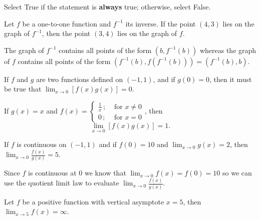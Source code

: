 \documentclass{ximera}
\author{Nela Lakos \and Kyle Parsons \and Bobby Ramsey}
\begin{document}
\begin{exercise}
	Select True if the statement is \textbf{always} true; otherwise, select False.

	Let $f$ be a one-to-one function and $f^{-1}$ its inverse.  If the point $(4,3)$ lies on the graph of $f^{-1}$, then the point $(3,4)$ lies on the graph of $f$.
	\begin{multipleChoice}
	\end{multipleChoice}
	\begin{feedback}
		The graph of $f^{-1}$ contains all points of the form $\left(b,f^{-1}(b)\right)$ whereas the graph of $f$ contains all points of the form $\left(f^{-1}(b),f(f^{-1}(b))\right)=\left(f^{-1}(b),b\right)$.
	\end{feedback}

	\begin{exercise}
		If $f$ and $g$ are two functions defined on $\left(-1,1\right)$, and if $g(0) = 0$, then it must be true that $\displaystyle \lim_{x\to0}\left[f(x)g(x)\right]=0$.

		\begin{multipleChoice}
			\choice{True}
			\choice[correct]{False}
		\end{multipleChoice}
		\begin{feedback}
			If $g(x) = x$ and $f(x)=\begin{cases} \frac{1}{x} \,; & \text{ for } x\neq0 \\ 0 \,; & \text{ for } x=0 \end{cases}$, then \[ \lim_{x\to0}\left[f(x)g(x)\right] = 1. \]
		\end{feedback}

		\begin{exercise}
    			If $f$ is continuous on $\left(-1,1\right)$ and if $f(0) = 10$ and $\displaystyle \lim_{x\to0}g(x) = 2$, then $\displaystyle \lim_{x\to0}\frac{f(x)}{g(x)} = 5$.    
	    		\begin{multipleChoice}
    				\choice[correct]{True}
    				\choice{False}
    			\end{multipleChoice}
    
    			\begin{feedback}
    				Since $f$ is continuous at 0 we know that $\displaystyle \lim_{x\to0}f(x) = f(0) = 10$ so we can use the quotient limit law to evaluate $\displaystyle \lim_{x\to0}\frac{f(x)}{g(x)}$.
    			\end{feedback}
    
   	 		\begin{exercise}
    				Let $f$ be a positive function with vertical asymptote $x=5$, then $\displaystyle \lim_{x\to5}f(x) = \infty$.
    				\begin{multipleChoice}
    				\end{multipleChoice}
    

\end{exercise}
\end{exercise}
\end{exercise}
\end{exercise}
\end{document}
